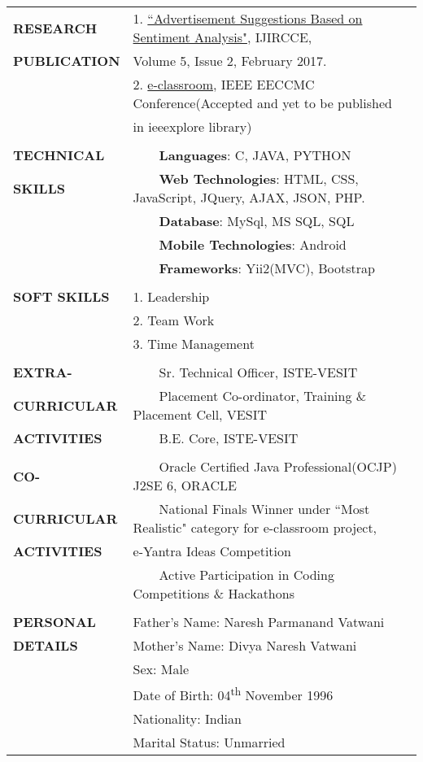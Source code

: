 \documentclass[letterpaper,11pt,oneside]{article}
\newcommand{\tabitem}{~~\llap{\textbullet}~~}
\begin{document}
	\newpage
	
	
	\noindent \begin{tabular}{@{} l l}
		\textbf{RESEARCH}    &1. \href{http://www.ijircce.com/upload/2017/february/44_6_Advertisement.pdf}{``Advertisement Suggestions Based on Sentiment Analysis"}, IJIRCCE,\\ 	
		\textbf{PUBLICATION}    & \hspace{0.3cm} Volume 5, Issue 2, February 2017. \\ 
		&2. \href{http://eeccmc.org/acceptance.php}{e-classroom},  IEEE EECCMC Conference(Accepted and yet to be published \\ & \hspace{0.3cm} in ieeexplore library)
		\\
		& \\
		\textbf{TECHNICAL}    & \tabitem \textbf{Languages}: C, JAVA, PYTHON\\
		\textbf{SKILLS}    & \tabitem \textbf{Web Technologies}: HTML, CSS, JavaScript, JQuery, AJAX, JSON, PHP. \\
		&\tabitem \textbf{Database}: MySql, MS SQL, SQL\\
		&\tabitem \textbf{Mobile Technologies}: Android\\
		&\tabitem \textbf{Frameworks}: Yii2(MVC), Bootstrap\\
		& \\
		\textbf{SOFT SKILLS}    &1. Leadership\\ 	 &2. Team Work \\ 
		&3. Time Management
		\\
		& \\
		\textbf{EXTRA-}    & \tabitem Sr. Technical Officer, ISTE-VESIT\\
		\textbf{CURRICULAR}    & \tabitem Placement Co-ordinator, Training \& Placement Cell, VESIT\\
		\textbf{ACTIVITIES}    & \tabitem B.E. Core, ISTE-VESIT \\
		& \\
		\textbf{CO-}    & \tabitem Oracle Certified Java Professional(OCJP) J2SE 6, ORACLE\\
		\textbf{CURRICULAR}    & \tabitem  National Finals Winner under ``Most Realistic" category for e-classroom project,\\
		\textbf{ACTIVITIES}    & \hspace{0.4cm} e-Yantra Ideas Competition\\
		& \tabitem 	Active Participation in Coding Competitions \& Hackathons
		\\	
		& \\
		\textbf{PERSONAL}    & Father's Name: Naresh Parmanand Vatwani\\
		\textbf{DETAILS}    & Mother's Name: Divya Naresh Vatwani \\
		&Sex: Male\\
		&Date of Birth: 04\textsuperscript{th} November 1996\\
		& Nationality: Indian\\
		& Marital Status: Unmarried\\
		
	\end{tabular}
	
\end{document}
